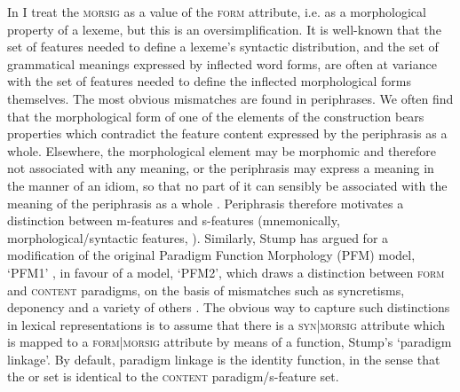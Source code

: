\documentclass[output=paper]{langsci/langscibook}
\begin{document}
In %
\citet{Spencer13} %
%
I treat the \textsc{morsig} as a value of the \textsc{form} attribute, i.e. as a morphological property of a lexeme, but this is an oversimplification. It is well-known that the set of features needed to define a lexeme's syntactic distribution, and the set of grammatical meanings expressed by inflected word forms, are often at variance with the set of features needed to define the inflected morphological forms themselves.   The most obvious mismatches are found in periphrases. We often find that   the morphological form of one of the elements of the construction bears properties which contradict the feature content expressed by the periphrasis as a whole.
Elsewhere, the morphological element may be morphomic and therefore not associated with any meaning, or the periphrasis may express a meaning in the manner of an idiom, so that no part of it can sensibly be associated with the meaning of the periphrasis as a whole \citep{Brown12c}. Periphrasis therefore motivates a distinction between \mbox{m-features} and \mbox{s-features} (mnemonically, morphological/syntactic features, \citealt{Sadler:Spencer01}). Similarly,  Stump has argued for a modification of the original Paradigm Function Morphology (PFM) model, `PFM1' \citep{Stump01:book}, in favour of a model, `PFM2', which draws a distinction between \textsc{form} and \textsc{content} paradigms, on the basis of mismatches such as syncretisms, deponency and a variety of others %
\citep{Stump02:paradigmlinkage,Stump06:heteroclisis,Stump16,Stump16:MorphMetatheory}%
%
. The obvious way to capture such distinctions in lexical representations is to assume that there is a \textsc{syn}|\textsc{morsig} attribute which is mapped to a \textsc{form}|\textsc{morsig} attribute by means of a function,  Stump's `paradigm linkage'. By default, paradigm linkage is the identity function, in the sense that the  or  set is identical to the \textsc{content} paradigm/s-feature set.
\end{document}
